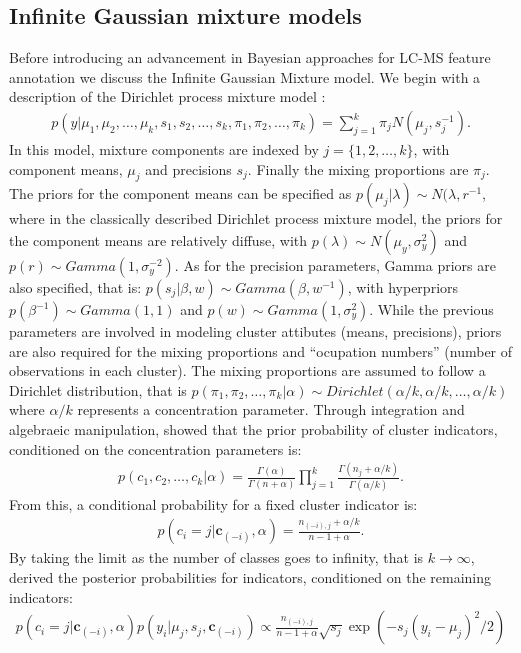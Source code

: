 \begin{DoubleSpace*}
\section{Infinite Gaussian mixture models}
Before introducing an advancement in Bayesian approaches for LC-MS feature annotation we discuss the Infinite Gaussian Mixture model. We begin with a description of the Dirichlet process mixture model \cite{ferguson1973}: 
\begin{align}
p(y|\mu_1,\mu_2, \hdots, \mu_k, s_1, s_2, \hdots, s_k, \pi_1, \pi_2, \hdots, \pi_k) = \sum_{j=1}^{k} \pi_j N(\mu_j,s_j^{-1}).
\end{align}
In this model, mixture components are indexed by $j=\{1,2, \hdots,k\}$, with component means, $\mu_j$ and precisions $s_j$. Finally the mixing proportions are $\pi_j$. The priors for the component means can be specified as $p(\mu_j|\lambda) \sim N(\lambda, r^{-1}$, where in the classically described Dirichlet process mixture model, the priors for the component means are relatively diffuse, with $p(\lambda)\sim N(\mu_y,\sigma_y^2)$ and $p(r)\sim Gamma(1,\sigma_y^{-2})$.  As for the precision parameters, Gamma priors are also specified, that is: $p(s_j|\beta,w) \sim Gamma(\beta,w^{-1})$, with hyperpriors $p(\beta^{-1}) \sim Gamma(1,1)$ and $p(w)\sim Gamma(1,\sigma_y^2)$. While the previous parameters are involved in modeling cluster attibutes (means, precisions), priors are also required for the mixing proportions and ``ocupation numbers'' (number of observations in each cluster). The mixing proportions are assumed to follow a Dirichlet distribution, that is $p(\pi_1,\pi_2,\hdots, \pi_k|\alpha)\sim Dirichlet(\alpha/k,\alpha/k,\hdots, \alpha/k)$ where $\alpha/k$ represents a concentration parameter. Through integration and algebraeic manipulation, \cite{rasmussen1999} showed that the prior probability of cluster indicators, conditioned on the concentration parameters is:
\begin{align}
p(c_1,c_2, \hdots, c_k|\alpha)=\frac{\Gamma(\alpha)}{\Gamma(n+\alpha)} \prod_{j=1}^{k} \frac{\Gamma(n_j+\alpha/k)}{\Gamma(\alpha/k)}.
\end{align} 
From this, a conditional probability for a fixed cluster indicator is: 
\begin{align}
p(c_i=j|\textbf{c}_{(-i)},\alpha) = \frac{n_{(-i),j}+\alpha/k}{n-1+\alpha}.
\end{align}
By taking the limit as the number of classes goes to infinity, that is $k\rightarrow \infty$, \cite{rasmussen1999} derived the posterior probabilities for indicators, conditioned on the remaining indicators:
\begin{align}
p(c_i=j|\textbf{c}_{(-i)},\alpha) p(y_i|\mu_j,s_j,\textbf{c}_{(-i)})\propto \frac{n_{(-i),j}}{n-1+\alpha} \sqrt{s_j} \exp(-s_j(y_i-\mu_j)^2/2)
\end{align}


\end{DoubleSpace*}
